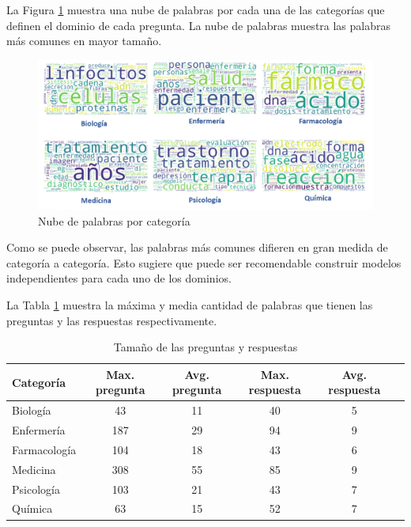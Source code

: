La Figura \ref{category} muestra una nube de palabras por cada una de las categorías que definen el dominio de cada pregunta. La nube de palabras muestra las palabras más comunes en mayor tamaño.

\begin{figure}[!tb]
  \begin{center}
    \includegraphics[angle=0, width=1\textwidth]{Graphics/word_category.png}
  \end{center}
    \caption{Nube de palabras por categoría}\label{category}
\end{figure}

Como se puede observar, las palabras más comunes difieren en gran medida de categoría a categoría. Esto sugiere que puede ser recomendable construir modelos independientes para cada uno de los dominios. 

La Tabla \ref{count} muestra la máxima y media cantidad de palabras que tienen las preguntas y las respuestas respectivamente.

\begin{table}[!tb]
  \begin{center}
    \caption{Tamaño de las preguntas y respuestas}
    \begin{tabular}{l|c|c|c|c|c}
      \textbf{Categoría} & \textbf{Max. pregunta} & \textbf{Avg. pregunta} & \textbf{Max. respuesta} & \textbf{Avg. respuesta} \\
      \hline
      Biología & 43 & 11 & 40 & 5 \\
      Enfermería & 187 & 29 & 94 & 9 \\
      Farmacología & 104 & 18 & 43 & 6 \\
      Medicina & 308 & 55 & 85 & 9 \\
      Psicología & 103 & 21 & 43 & 7 \\
      Química & 63 & 15 & 52 & 7 \\     
    \end{tabular}
  \end{center}
  \label{count}
\end{table}

